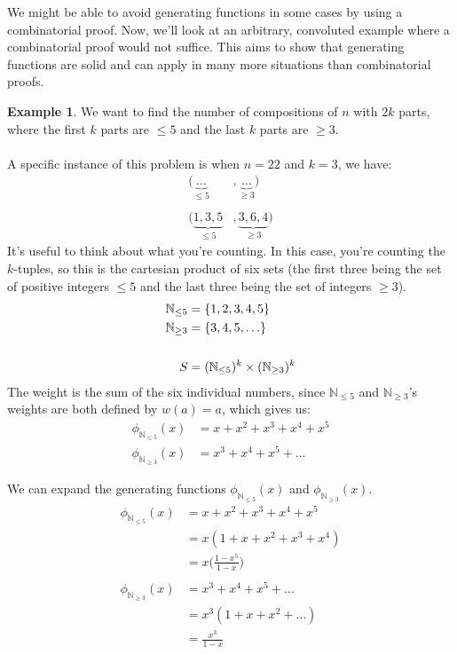 \documentclass[]{article}
\theoremstyle{definition}
\newtheorem{ex}{Example}[section]
\newcommand{\lecture}[1]{\marginpar{{\footnotesize $\leftarrow$ \underline{#1}}}}
\DeclarePairedDelimiter{\set}{\lbrace}{\rbrace}
\begin{document}
				We might be able to avoid generating functions in some cases by using a combinatorial proof. Now, we'll look at an arbitrary, convoluted example where a combinatorial proof would not suffice. This aims to show that generating functions are solid and can apply in many more situations than combinatorial proofs.
				
				\begin{ex}
					We want to find the number of compositions of $n$ with $2k$ parts, where the first $k$ parts are $\le 5$ and the last $k$ parts are $\ge 3$. 
					\\ \\
					A specific instance of this problem is when $n = 22$ and $k = 3$, we have:
					\begin{align*}
						(\underbrace{\dots}_{\le 5}&, \underbrace{\dots}_{\ge 3}) \\ \\
						(\underbrace{1, 3, 5}_{\le 5}&, \underbrace{3, 6, 4}_{\ge 3})
					\end{align*}
					It's useful to think about what you're counting. In this case, you're counting the $k$-tuples, so this is the cartesian product of six sets (the first three being the set of positive integers $\le 5$ and the last three being the set of integers $\ge 3$).
					\begin{align*}
						\mathbb{N}_{\le 5} &= \set{1, 2, 3, 4, 5} \\
						\mathbb{N}_{\ge 3} &= \set{3, 4, 5, \ldots}
						\\ \\
						S &= (\mathbb{N}_{\le 5})^k \times (\mathbb{N}_{\ge 3})^k
					\end{align*}
					The weight is the sum of the six individual numbers, since $\mathbb{N}_{\le 5}$ and $\mathbb{N}_{\ge 3}$'s weights are both defined by $w(a) = a$, which gives us:
					\begin{align*}
						\phi_{\mathbb{N}_{\le 5}}(x) &= x + x^2 + x^3 + x^4 + x^5 \\
						\phi_{\mathbb{N}_{\ge 3}}(x) &= x^3 + x^4 + x^5 + \ldots
					\end{align*}

					\lecture{January 23, 2013}
					We can expand the generating functions $\phi_{\mathbb{N}_{\le 5}}(x)$ and $\phi_{\mathbb{N}_{\ge 3}}(x)$.
					\begin{align*}
						\phi_{\mathbb{N}_{\le 5}}(x) &= x + x^2 + x^3 + x^4 + x^5 \\
						&= x(1 + x + x^2 + x^3 + x^4) \\
						&= x \bigg( \frac{1 - x^5}{1 - x} \bigg)
						\\ \\
						\phi_{\mathbb{N}_{\ge 3}}(x) &= x^3 + x^4 + x^5 + \ldots \\
						&= x^3(1 + x + x^2 + \ldots) \\
						&= \frac{x^3}{1 - x}
					\end{align*}


\end{ex}
\end{document}
